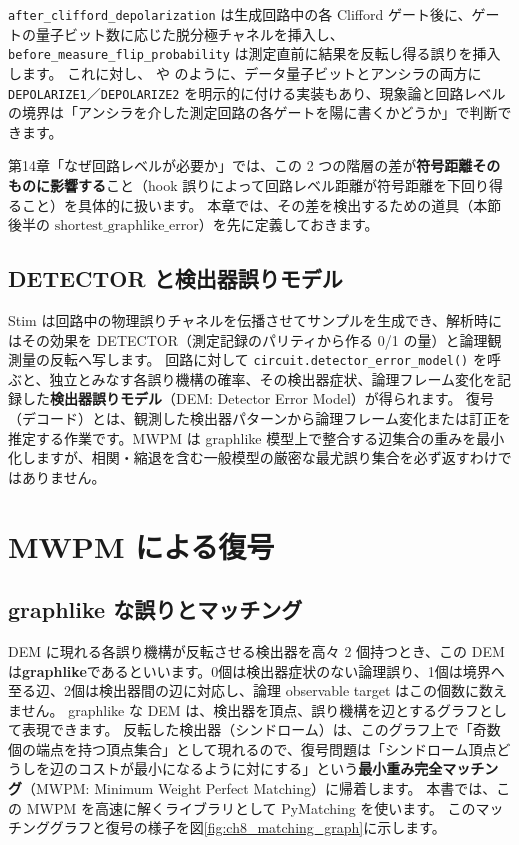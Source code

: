 \texttt{after\_clifford\_depolarization} は生成回路中の各 Clifford ゲート後に、ゲートの量子ビット数に応じた脱分極チャネルを挿入し、\texttt{before\_measure\_flip\_probability} は測定直前に結果を反転し得る誤りを挿入します\cite{stim2026python}。
これに対し、 や  のように、データ量子ビットとアンシラの両方に \texttt{DEPOLARIZE1}／\texttt{DEPOLARIZE2} を明示的に付ける実装もあり、現象論と回路レベルの境界は「アンシラを介した測定回路の各ゲートを陽に書くかどうか」で判断できます。

\begin{notebox}
  第14章「なぜ回路レベルが必要か」では、この 2 つの階層の差が\textbf{符号距離そのものに影響する}こと（hook 誤りによって回路レベル距離が符号距離を下回り得ること）を具体的に扱います。
  本章では、その差を検出するための道具（本節後半の $\mathrm{shortest\_graphlike\_error}$）を先に定義しておきます。
\end{notebox}

\subsection{DETECTOR と検出器誤りモデル}

Stim は回路中の物理誤りチャネルを伝播させてサンプルを生成でき、解析時にはその効果を DETECTOR（測定記録のパリティから作る 0/1 の量）と論理観測量の反転へ写します。
回路に対して \texttt{circuit.detector\_error\_model()} を呼ぶと、独立とみなす各誤り機構の確率、その検出器症状、論理フレーム変化を記録した\textbf{検出器誤りモデル}（DEM: Detector Error Model）が得られます\cite{gidney2021stim,stim2026doc}。
復号（デコード）とは、観測した検出器パターンから論理フレーム変化または訂正を推定する作業です。MWPM は graphlike 模型上で整合する辺集合の重みを最小化しますが、相関・縮退を含む一般模型の厳密な最尤誤り集合を必ず返すわけではありません\cite{higgott2022pymatching,higgott2025sparse}。

\section{MWPM による復号}\label{sec:mwpm}

\subsection{graphlike な誤りとマッチング}

DEM に現れる各誤り機構が反転させる検出器を高々 2 個持つとき、この DEM は\textbf{graphlike}であるといいます。0個は検出器症状のない論理誤り、1個は境界へ至る辺、2個は検出器間の辺に対応し、論理 observable target はこの個数に数えません\cite{stim2026doc}。
graphlike な DEM は、検出器を頂点、誤り機構を辺とするグラフとして表現できます。
反転した検出器（シンドローム）は、このグラフ上で「奇数個の端点を持つ頂点集合」として現れるので、復号問題は「シンドローム頂点どうしを辺のコストが最小になるように対にする」という\textbf{最小重み完全マッチング}（MWPM: Minimum Weight Perfect Matching）に帰着します。
本書では、この MWPM を高速に解くライブラリとして PyMatching を使います。
このマッチンググラフと復号の様子を図\ref{fig:ch8_matching_graph}に示します。

